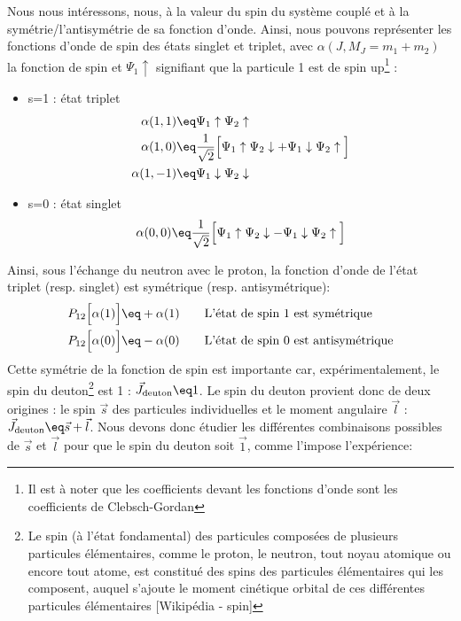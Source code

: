 Nous nous intéressons, nous, à la valeur du spin du système couplé et à la symétrie/l'antisymétrie de sa fonction d'onde. Ainsi, nous pouvons représenter les fonctions d'onde de spin des états singlet et triplet, avec $\alpha(J,M_J=m_1+m_2)$ la fonction de spin et $\Psi_1\uparrow$ signifiant que la particule 1 est de spin up\footnote{Il est à noter que les coefficients devant les fonctions d'onde sont les coefficients de Clebsch-Gordan} :
\begin{itemize}[label=$\bullet$]
    \item s=1 : état triplet
    \begin{align*}
        \alpha (1,1)  &\eq \Psi_1\uparrow \Psi_2\uparrow \\
        \alpha (1,0)  &\eq  \dfrac{1}{\sqrt{2}} \Big[ \Psi_1\uparrow\Psi_2\downarrow +  \Psi_1\downarrow\Psi_2\uparrow\Big]\\
        \alpha (1,-1) &\eq \Psi_1\downarrow\Psi_2\downarrow
    \end{align*}
    \item s=0 : état singlet
    \begin{equation}
        \alpha (0,0)  \eq  \dfrac{1}{\sqrt{2}} \Big[ \Psi_1\uparrow\Psi_2\downarrow -  \Psi_1\downarrow\Psi_2\uparrow\Big]
    \end{equation}
\end{itemize}
Ainsi, sous l'échange du neutron avec le proton, la fonction d'onde de l'état triplet (resp. singlet) est symétrique (resp. antisymétrique):
\begin{align*}
    P_{12} \Big[ \alpha(1) \Big] &\eq +\alpha(1) \qquad \text{L'état de spin 1 est symétrique}\\
    P_{12} \Big[ \alpha(0) \Big] &\eq -\alpha(0) \qquad \text{L'état de spin 0 est antisymétrique}
\end{align*}
Cette symétrie de la fonction de spin est importante car, expérimentalement, le spin du deuton\footnote{Le spin (à l'état fondamental) des particules composées de plusieurs particules élémentaires, comme le proton, le neutron, tout noyau atomique ou encore tout atome, est constitué des spins des particules élémentaires qui les composent, auquel s'ajoute le moment cinétique orbital de ces différentes particules élémentaires [Wikipédia - spin]} est 1 : $\vec{J}_{\text{deuton}} \eq 1$. Le spin du deuton provient donc de deux origines : le spin $\vec{s}$ des particules individuelles et le moment angulaire $\vec{l}$ : $\vec{J}_{\text{deuton}} \eq \vec{s}+\vec{l}$. Nous devons donc étudier les différentes combinaisons possibles de $\vec{s}$ et $\vec{l}$ pour que le spin du deuton soit $\vec{1}$, comme l'impose l'expérience:
